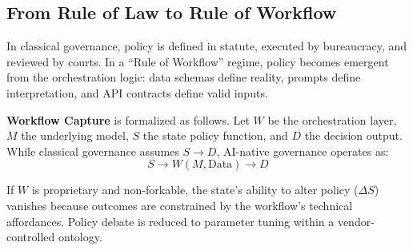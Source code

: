 \documentclass[11pt,a4paper]{article}
\theoremstyle{definition}
\begin{document}
\subsection{From Rule of Law to Rule of Workflow}

In classical governance, policy is defined in statute, executed by bureaucracy, and reviewed by courts. In a ``Rule of Workflow'' regime, policy becomes emergent from the orchestration logic: data schemas define reality, prompts define interpretation, and API contracts define valid inputs.

\textbf{Workflow Capture} is formalized as follows. Let $W$ be the orchestration layer, $M$ the underlying model, $S$ the state policy function, and $D$ the decision output. While classical governance assumes $S \rightarrow D$, AI-native governance operates as:
\begin{equation}
S \rightarrow W(M, \text{Data}) \rightarrow D
\end{equation}

If $W$ is proprietary and non-forkable, the state's ability to alter policy ($\Delta S$) vanishes because outcomes are constrained by the workflow's technical affordances. Policy debate is reduced to parameter tuning within a vendor-controlled ontology.
\end{document}

